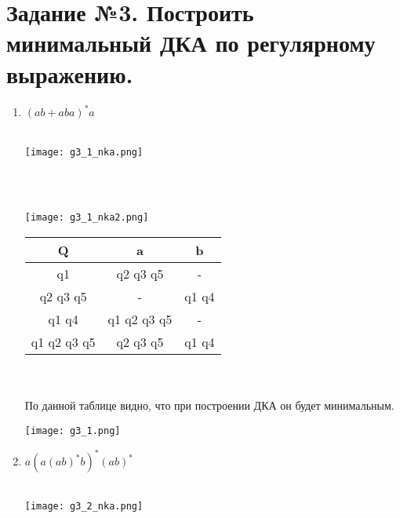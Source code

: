 \documentclass{article}
\begin{document}
\section{Задание №3. Построить минимальный ДКА по регулярному выражению.}
\begin{enumerate}
    \item {$(ab + aba)^*a$} \\ \\ 
    \begin{flushleft}
        \texttt{[image: g3\_1\_nka.png]}
    \end{flushleft}
     \\ \\
    \begin{flushleft}
        \texttt{[image: g3\_1\_nka2.png]}
    \end{flushleft}
    \begin{tabular}{|c|c|c|}
        \hline
         Q              & a             & b     \\ \hline
         q1             & q2 q3 q5      & -     \\
         q2 q3 q5       & -             & q1 q4 \\
         q1 q4          & q1 q2 q3 q5   & -     \\ 
         q1 q2 q3 q5    & q2 q3 q5      & q1 q4 \\ \hline
    \end{tabular} \\ \\
    По данной таблице видно, что при построении ДКА он будет минимальным. 
    \\ 
    \begin{flushleft}
        \texttt{[image: g3\_1.png]}
    \end{flushleft}
    \item {$a(a(ab)^*b)^*(ab)^*$} \\ \\
    \begin{flushleft}
        \texttt{[image: g3\_2\_nka.png]}
    \end{flushleft}
     \\ \\
    \begin{flushleft}

\end{flushleft}
\end{enumerate}
\end{document}
